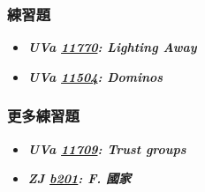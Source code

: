 \subsubsection*{練習題}
\begin{itemize}[label={\Checkmark}]
\item \textbf{\textit{UVa \href{http://uva.onlinejudge.org/external/117/11770.html}{11770}: Lighting Away}}\\

\item \textbf{\textit{UVa \href{http://uva.onlinejudge.org/external/115/11504.html}{11504}: Dominos}}\\

\end{itemize}
\subsubsection*{更多練習題}
\begin{itemize}[label={\PencilLeftDown}]
\item \textbf{\textit{UVa \href{http://uva.onlinejudge.org/external/117/11709.html}{11709}: Trust groups}}
\item \textbf{\textit{ZJ \href{http://zerojudge.tw/ShowProblem?problemid=b201}{b201}: F. 國家}}
\end{itemize}